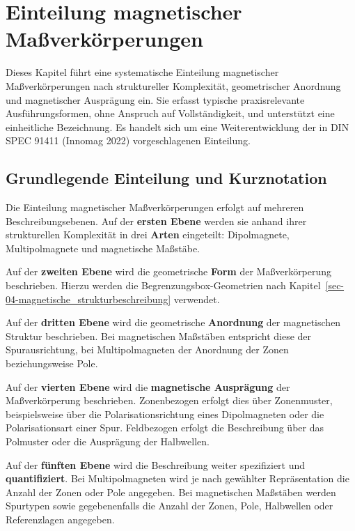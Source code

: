 \documentclass[
  ngerman,
  a4paper,
  twoside]{scrbook}
\begin{document}

\chapter{Einteilung magnetischer Maßverkörperungen}\label{sec-07}

Dieses Kapitel führt eine systematische Einteilung magnetischer
Maßverkörperungen nach struktureller Komplexität, geometrischer
Anordnung und magnetischer Ausprägung ein. Sie erfasst typische
praxisrelevante Ausführungsformen, ohne Anspruch auf Vollständigkeit,
und unterstützt eine einheitliche Bezeichnung. Es handelt sich um eine
Weiterentwicklung der in DIN SPEC 91411 (Innomag 2022) vorgeschlagenen
Einteilung.

\section{Grundlegende Einteilung und
Kurznotation}\label{sec-07-grundlegende-einteilung}

Die Einteilung magnetischer Maßverkörperungen erfolgt auf mehreren
Beschreibungsebenen. Auf der \textbf{ersten Ebene} werden sie anhand
ihrer strukturellen Komplexität in drei \textbf{Arten} eingeteilt:
Dipolmagnete, Multipolmagnete und magnetische Maßstäbe.

Auf der \textbf{zweiten Ebene} wird die geometrische \textbf{Form} der
Maßverkörperung beschrieben. Hierzu werden die Begrenzungsbox-Geometrien
nach Kapitel~\ref{sec-04-magnetische_strukturbeschreibung} verwendet.

Auf der \textbf{dritten Ebene} wird die geometrische \textbf{Anordnung}
der magnetischen Struktur beschrieben. Bei magnetischen Maßstäben
entspricht diese der Spurausrichtung, bei Multipolmagneten der Anordnung
der Zonen beziehungsweise Pole.

Auf der \textbf{vierten Ebene} wird die \textbf{magnetische Ausprägung}
der Maßverkörperung beschrieben. Zonenbezogen erfolgt dies über
Zonenmuster, beispielsweise über die Polarisationsrichtung eines
Dipolmagneten oder die Polarisationsart einer Spur. Feldbezogen erfolgt
die Beschreibung über das Polmuster oder die Ausprägung der Halbwellen.

Auf der \textbf{fünften Ebene} wird die Beschreibung weiter spezifiziert
und \textbf{quantifiziert}. Bei Multipolmagneten wird je nach gewählter
Repräsentation die Anzahl der Zonen oder Pole angegeben. Bei
magnetischen Maßstäben werden Spurtypen sowie gegebenenfalls die Anzahl
der Zonen, Pole, Halbwellen oder Referenzlagen angegeben.
\end{document}

